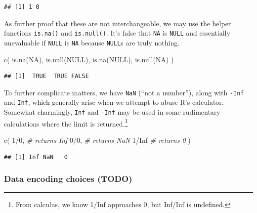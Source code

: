 \documentclass[
]{krantz}
\makeatletter
\newenvironment{Shaded}{\begin{snugshade}}{\end{snugshade}}
\newcommand{\CommentTok}[1]{\textcolor[rgb]{0.37,0.37,0.37}{\textit{#1}}}
\newcommand{\ConstantTok}[1]{\textcolor[rgb]{0,0,0}{#1}}
\newcommand{\DecValTok}[1]{\textcolor[rgb]{0.06,0.06,0.06}{#1}}
\newcommand{\FunctionTok}[1]{\textcolor[rgb]{0,0,0}{#1}}
\newcommand{\NormalTok}[1]{#1}
\newcommand{\SpecialCharTok}[1]{\textcolor[rgb]{0,0,0}{#1}}
\newenvironment{kframe}{%
\medskip{}
\setlength{\fboxsep}{.8em}
 \def\at@end@of@kframe{}%
 \ifinner\ifhmode%
  \def\at@end@of@kframe{\end{minipage}}%
  \begin{minipage}{\columnwidth}%
 \fi\fi%
 \def\FrameCommand##1{\hskip\@totalleftmargin \hskip-\fboxsep
 \colorbox{shadecolor}{##1}\hskip-\fboxsep
     \hskip-\linewidth \hskip-\@totalleftmargin \hskip\columnwidth}%
 \MakeFramed {\advance\hsize-\width
   \@totalleftmargin\z@ \linewidth\hsize
   \@setminipage}}%
 {\par\unskip\endMakeFramed%
 \at@end@of@kframe}
\renewenvironment{Shaded}{\begin{kframe}}{\end{kframe}}
\makeatother
\begin{document}
\begin{verbatim}
## [1] 1 0
\end{verbatim}

As further proof that these are not interchangeable, we may use the helper functions \texttt{is.na()} and \texttt{is.null()}. It's false that \texttt{NA} is \texttt{NULL} and essentially unevaluable if \texttt{NULL} is \texttt{NA} because \texttt{NULL}s are truly nothing.

\begin{Shaded}
\begin{Highlighting}[]
\FunctionTok{c}\NormalTok{(}
  \FunctionTok{is.na}\NormalTok{(}\ConstantTok{NA}\NormalTok{),}
  \FunctionTok{is.null}\NormalTok{(}\ConstantTok{NULL}\NormalTok{),}
  \FunctionTok{is.na}\NormalTok{(}\ConstantTok{NULL}\NormalTok{),}
  \FunctionTok{is.null}\NormalTok{(}\ConstantTok{NA}\NormalTok{)}
\NormalTok{)}
\end{Highlighting}
\end{Shaded}

\begin{verbatim}
## [1]  TRUE  TRUE FALSE
\end{verbatim}

To further complicate matters, we have \texttt{NaN} (``not a number''), along with \texttt{-Inf} and \texttt{Inf}, which generally arise when we attempt to abuse R's calculator. Somewhat charmingly, \texttt{Inf} and \texttt{-Inf} may be used in some rudimentary calculations where the limit is returned.\footnote{From calculus, we know 1/Inf approaches 0, but Inf/Inf is undefined.}

\begin{Shaded}
\begin{Highlighting}[]
\FunctionTok{c}\NormalTok{(}
  \DecValTok{1}\SpecialCharTok{/}\DecValTok{0}\NormalTok{,   }\CommentTok{\# returns Inf}
  \DecValTok{0}\SpecialCharTok{/}\DecValTok{0}\NormalTok{,   }\CommentTok{\# returns NaN}
  \DecValTok{1}\SpecialCharTok{/}\ConstantTok{Inf}  \CommentTok{\# returns 0}
\NormalTok{)}
\end{Highlighting}
\end{Shaded}

\begin{verbatim}
## [1] Inf NaN   0
\end{verbatim}

\hypertarget{data-encoding-choices-todo}{%
\subsubsection{Data encoding choices (TODO)}\label{data-encoding-choices-todo}}
\end{document}
